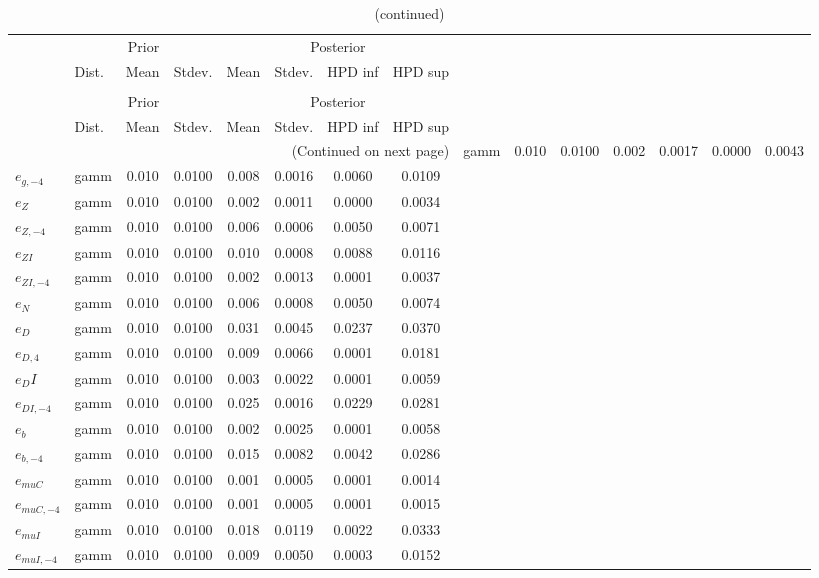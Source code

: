  
\begin{center}
\begin{longtable}{llcccccc} 
\caption{Results from Metropolis-Hastings (standard deviation of structural shocks)}
 \label{Table:MHPosterior:2}\\
\toprule 
  & \multicolumn{3}{c}{Prior}  &  \multicolumn{4}{c}{Posterior} \\
  \cmidrule(r{.75em}){2-4} \cmidrule(r{.75em}){5-8}
  & Dist. & Mean  & Stdev. & Mean & Stdev. & HPD inf & HPD sup\\
\midrule \endfirsthead 
\caption{(continued)}\\\toprule 
  & \multicolumn{3}{c}{Prior}  &  \multicolumn{4}{c}{Posterior} \\
  \cmidrule(r{.75em}){2-4} \cmidrule(r{.75em}){5-8}
  & Dist. & Mean  & Stdev. & Mean & Stdev. & HPD inf & HPD sup\\
\midrule \endhead 
\bottomrule \multicolumn{8}{r}{(Continued on next page)} \endfoot 
\bottomrule \endlastfoot 
${e_g}$ & gamm &   0.010 & 0.0100 &   0.002& 0.0017 &  0.0000 &  0.0043 \\ 
${e_{g,-4}}$ & gamm &   0.010 & 0.0100 &   0.008& 0.0016 &  0.0060 &  0.0109 \\ 
${e_Z}$ & gamm &   0.010 & 0.0100 &   0.002& 0.0011 &  0.0000 &  0.0034 \\ 
${e_{Z,-4}}$ & gamm &   0.010 & 0.0100 &   0.006& 0.0006 &  0.0050 &  0.0071 \\ 
${e_{ZI}}$ & gamm &   0.010 & 0.0100 &   0.010& 0.0008 &  0.0088 &  0.0116 \\ 
${e_{ZI,-4}}$ & gamm &   0.010 & 0.0100 &   0.002& 0.0013 &  0.0001 &  0.0037 \\ 
${e_N}$ & gamm &   0.010 & 0.0100 &   0.006& 0.0008 &  0.0050 &  0.0074 \\ 
${e_D}$ & gamm &   0.010 & 0.0100 &   0.031& 0.0045 &  0.0237 &  0.0370 \\ 
${e_{D,4}}$ & gamm &   0.010 & 0.0100 &   0.009& 0.0066 &  0.0001 &  0.0181 \\ 
${e_DI}$ & gamm &   0.010 & 0.0100 &   0.003& 0.0022 &  0.0001 &  0.0059 \\ 
${e_{DI,-4}}$ & gamm &   0.010 & 0.0100 &   0.025& 0.0016 &  0.0229 &  0.0281 \\ 
${e_b}$ & gamm &   0.010 & 0.0100 &   0.002& 0.0025 &  0.0001 &  0.0058 \\ 
${e_{b,-4}}$ & gamm &   0.010 & 0.0100 &   0.015& 0.0082 &  0.0042 &  0.0286 \\ 
${e_{muC}}$ & gamm &   0.010 & 0.0100 &   0.001& 0.0005 &  0.0001 &  0.0014 \\ 
${e_{muC,-4}}$ & gamm &   0.010 & 0.0100 &   0.001& 0.0005 &  0.0001 &  0.0015 \\ 
${e_{muI}}$ & gamm &   0.010 & 0.0100 &   0.018& 0.0119 &  0.0022 &  0.0333 \\ 
${e_{muI,-4}}$ & gamm &   0.010 & 0.0100 &   0.009& 0.0050 &  0.0003 &  0.0152 \\ 
\end{longtable}
 \end{center}
